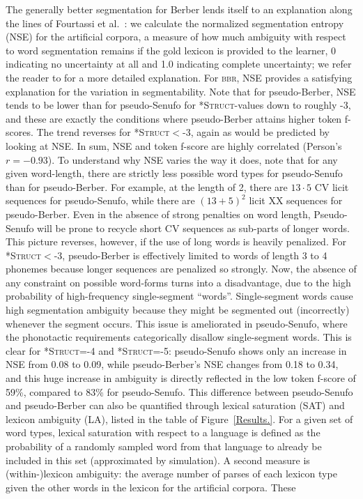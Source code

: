 \documentclass[11pt]{article}
\begin{document}
The generally better segmentation for Berber lends itself to an explanation along the lines of Fourtassi et al.~: we calculate the normalized segmentation entropy (NSE) for the artificial corpora, a measure of how much ambiguity with respect to word segmentation remains if the gold lexicon is provided to the learner, 0 indicating no uncertainty at all and 1.0 indicating complete uncertainty; we refer the reader to \cite{Fourtassi13a} for a more detailed explanation. For \textsc{bbr}, NSE provides a satisfying explanation for the variation in segmentability. Note that for pseudo-Berber, NSE tends to be lower than for pseudo-Senufo for \textsc{*Struct}-values down to roughly -3, and these are exactly the conditions where pseudo-Berber attains higher token f-scores. The trend reverses for \textsc{*Struct}$<$-3, again as would be predicted by looking at NSE. In sum, NSE and token f-score are highly correlated (Person's $r = -0.93$). To understand why NSE varies the way it does, note that for any given word-length, there are strictly less possible word types for pseudo-Senufo than for pseudo-Berber. For example, at the length of 2, there are $13 \cdot 5$ CV licit sequences for pseudo-Senufo, while there are $(13+5)^2$ licit XX sequences for pseudo-Berber. Even in the absence of strong penalties on word length, Pseudo-Senufo will be prone to recycle short CV sequences as sub-parts of longer words. This picture reverses, however, if the use of long words is heavily penalized. For \textsc{*Struct}$<$-3, pseudo-Berber is effectively limited to words of length 3 to 4 phonemes because longer sequences are penalized so strongly. Now, the absence of any constraint on possible word-forms turns into a disadvantage, due to the high probability of high-frequency single-segment ``words''. Single-segment words cause high segmentation ambiguity because they might be segmented out (incorrectly) whenever the segment occurs. This issue is ameliorated in pseudo-Senufo, where the phonotactic requirements categorically disallow single-segment words. This is clear for \textsc{*Struct}=-4 and \textsc{*Struct}=-5: pseudo-Senufo shows only an increase in NSE from 0.08 to 0.09, while pseudo-Berber's NSE changes from 0.18 to 0.34, and this huge increase in ambiguity is directly reflected in the low token f-score of 59\%, compared to 83\% for pseudo-Senufo. This difference between pseudo-Senufo and pseudo-Berber can also be quantified through lexical saturation (SAT) and lexicon ambiguity (LA), listed in the table of Figure~\ref{Results.}. For a given set of word types, lexical saturation with respect to a language is defined as the probability of a randomly sampled word from that language to already be included in this set (approximated by simulation). A second measure is (within-)lexicon ambiguity: the average number of parses of each lexicon type given the other words in the lexicon for the artificial corpora. These 
\end{document}
